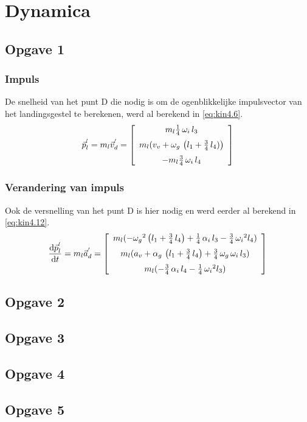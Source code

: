 \section{Dynamica}
\subsection{Opgave 1}
\subsubsection{Impuls}
De snelheid van het punt D die nodig is om de ogenblikkelijke impulsvector van het landingsgestel te berekenen, werd al berekend in \eqref{eq:kin4.6}.
\begin{equation}
\vec{p}_{l}^{'}=m_{l}\vec{v}_{d}^{'}=
\left[ \begin {array}{c} m_{l}\frac{1}{4}\,\omega_{i}\,l_{3}\\ \noalign{\medskip}m_{l}(v_{v}+\omega_{g}\, \left( l_{1}+\frac{3}{4}\,l_{4}) \right) \\ \noalign{\medskip}-m_{l}\frac{3}{4}\,\omega_{i}\,l_{4}\end {array} \right]
\label{eq:dyn1.1}
\end{equation}
\subsubsection{Verandering van impuls}
Ook de versnelling van het punt D is hier nodig en werd eerder al berekend in \eqref{eq:kin4.12}.
\begin{equation}
\frac{\mathrm{d}\vec{p}_{l}^{'}}{\mathrm{d}t}=m_{l}\vec{a}_{d}^{'}
=\left[ \begin {array}{c} m_{l}(-{\omega_{g}}^{2} \left( l_{1}+\frac{3}{4}\,l_{4} \right) +\frac{1}{4} \,\alpha_{i}\,l_{3}-\frac{3}{4}\,{\omega_{i}}^{2}l_{4})\\ \noalign{\medskip}m_{l}(a_{v}+\alpha_{g}\, \left( l_{1}+\frac{3}{4}\,l_{4} \right) +\frac{3}{4}\,\omega_{g}\,\omega_{i}\,l_{3})\\ \noalign{\medskip}m_{l}(-\frac{3}{4}\,\alpha_{i}\,l_{4}-\frac{1}{4}\,{\omega_{i}}^{2}l_{3})\end {array} \right]
\label{eq:dyn1.2}
\end{equation}
\subsection{Opgave 2}
\subsection{Opgave 3}
\subsection{Opgave 4}
\subsection{Opgave 5}